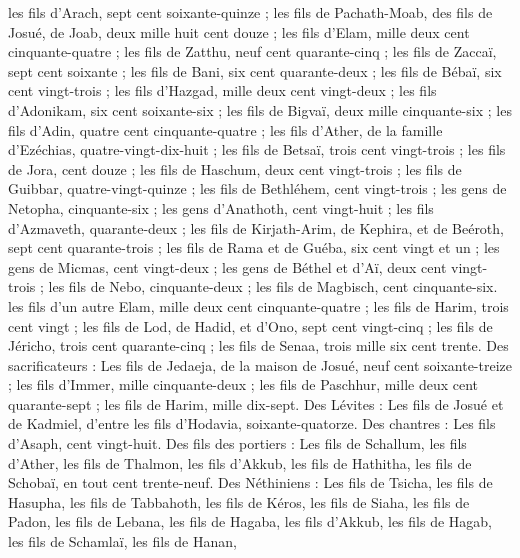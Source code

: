 \begin{multicols}{2}
les fils d'Arach, sept cent soixante-quinze ;
les fils de Pachath-Moab, des fils de Josué, de Joab, deux mille huit cent douze ;
les fils d'Elam, mille deux cent cinquante-quatre ;
les fils de Zatthu, neuf cent quarante-cinq ;
les fils de Zaccaï, sept cent soixante ;
les fils de Bani, six cent quarante-deux ;
les fils de Bébaï, six cent vingt-trois ;
les fils d'Hazgad, mille deux cent vingt-deux ;
les fils d'Adonikam, six cent soixante-six ;
les fils de Bigvaï, deux mille cinquante-six ;
les fils d’Adin, quatre cent cinquante-quatre ;
les fils d'Ather, de la famille d'Ezéchias, quatre-vingt-dix-huit ;
les fils de Betsaï, trois cent vingt-trois ;
les fils de Jora, cent douze ;
les fils de Haschum, deux cent vingt-trois ;
les fils de Guibbar, quatre-vingt-quinze ;
les fils de Bethléhem, cent vingt-trois ;
les gens de Netopha, cinquante-six ;
les gens d'Anathoth, cent vingt-huit ;
les fils d'Azmaveth, quarante-deux ;
les fils de Kirjath-Arim, de Kephira, et de Beéroth, sept cent quarante-trois ;
les fils de Rama et de Guéba, six cent vingt et un ;
les gens de Micmas, cent vingt-deux ;
les gens de Béthel et d’Aï, deux cent vingt-trois ;
les fils de Nebo, cinquante-deux ;
les fils de Magbisch, cent cinquante-six.
les fils d'un autre Elam, mille deux cent cinquante-quatre ;
les fils de Harim, trois cent vingt ;
les fils de Lod, de Hadid, et d'Ono, sept cent vingt-cinq ;
les fils de Jéricho, trois cent quarante-cinq ;
les fils de Senaa, trois mille six cent trente.
Des sacrificateurs : Les fils de Jedaeja, de la maison de Josué, neuf cent soixante-treize ;
les fils d'Immer, mille cinquante-deux ;
les fils de Paschhur, mille deux cent quarante-sept ;
les fils de Harim, mille dix-sept.
Des Lévites : Les fils de Josué et de Kadmiel, d'entre les fils d’Hodavia, soixante-quatorze.
Des chantres : Les fils d'Asaph, cent vingt-huit.
Des fils des portiers : Les fils de Schallum, les fils d'Ather, les fils de Thalmon, les fils d’Akkub, les fils de Hathitha, les fils de Schobaï, en tout cent trente-neuf.
Des Néthiniens : Les fils de Tsicha, les fils de Hasupha, les fils de Tabbahoth,
les fils de Kéros, les fils de Siaha, les fils de Padon,
les fils de Lebana, les fils de Hagaba, les fils d'Akkub,
les fils de Hagab, les fils de Schamlaï, les fils de Hanan,

\end{multicols}
